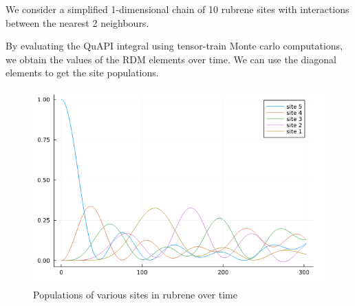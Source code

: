 We consider a simplified 1-dimensional chain of 10 rubrene sites with interactions between the nearest 2 neighbours.

By evaluating the QuAPI integral using tensor-train Monte carlo computations, we obtain the values of the RDM elements over time. We can use the diagonal elements to get the site populations.

\begin{figure}
    \center
    \includegraphics[scale=0.4]{Figures/rubrene_result.png}
    \caption{Populations of various sites in rubrene over time}
\end{figure}






